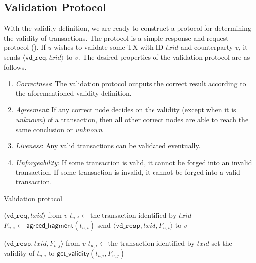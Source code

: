 \subsection{Validation Protocol}
With the validity definition, we are ready to construct a protocol for determining the validity of transactions.
The protocol is a simple response and request protocol ().
If $u$ wishes to validate some TX with ID $txid$ and counterparty $v$, it sends $\langle \texttt{vd\_req}, txid \rangle$ to $v$.
The desired properties of the validation protocol are as follows.
\begin{definition}
\label{def:validation}
\begin{enumerate}
    \item \emph{Correctness}:
        The validation protocol outputs the correct result
        according to the aforementioned validity definition.
    \item \emph{Agreement}:
        If any correct node decides on the validity (except when it is \emph{unknown}) of a transaction,
        then all other correct nodes are able to reach the same conclusion or \emph{unknown}.
    \item \emph{Liveness}:
        Any valid transactions can be validated eventually.
    \item \emph{Unforgeability}:
        If some transaction is valid, it cannot be forged into an invalid transaction.
        If some transaction is invalid, it cannot be forged into a valid transaction.
\end{enumerate}
\end{definition}

\begin{algorithm}
\caption{Validation protocol}
\label{alg:vd-proto}

\begin{algorithmic}
    \Upon $\langle \texttt{vd\_req}, txid \rangle$ from $v$
        \State $t_{u, i} \gets \text{the transaction identified by } txid$
        \State $F_{u, i} \gets \textsf{agreed\_fragment}(t_{u, i})$
        \State send $\langle \texttt{vd\_resp}, txid, F_{u, i} \rangle$ to $v$

    \Upon $\langle \texttt{vd\_resp}, txid, F_{v, j} \rangle$ from $v$
        \State $t_{u, i} \gets \text{the transaction identified by } txid$
        \State set the validity of $t_{u, i}$ to $\textsf{get\_validity}(t_{u, i}, F_{v, j})$
\end{algorithmic}
\end{algorithm}

